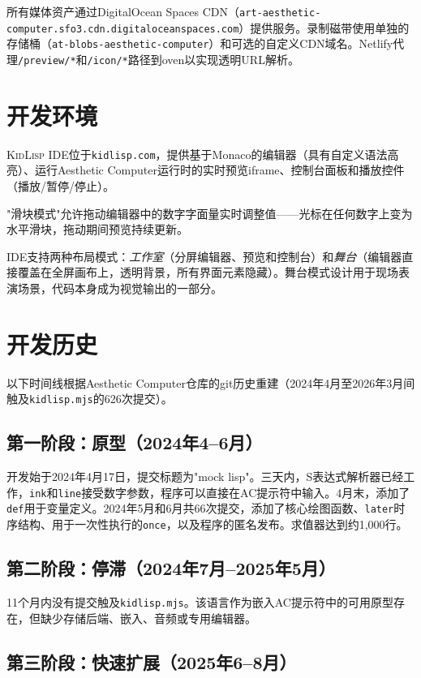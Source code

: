 \documentclass[10pt,letterpaper,twocolumn]{article}
\newcommand{\kidlisp}{\textsc{KidLisp}}
\begin{document}
所有媒体资产通过DigitalOcean Spaces CDN（\texttt{art-aesthetic-computer.sfo3.cdn.\allowbreak digitaloceanspaces.com}）提供服务。录制磁带使用单独的存储桶（\texttt{at-blobs-aesthetic-computer}）和可选的自定义CDN域名。Netlify代理\texttt{/preview/*}和\texttt{/icon/*}路径到oven以实现透明URL解析。

\section{开发环境}

\kidlisp{} IDE位于\texttt{kidlisp.com}，提供基于Monaco的编辑器（具有自定义语法高亮）、运行Aesthetic Computer运行时的实时预览iframe、控制台面板和播放控件（播放/暂停/停止）。

"滑块模式"允许拖动编辑器中的数字字面量实时调整值——光标在任何数字上变为水平滑块，拖动期间预览持续更新。

IDE支持两种布局模式：\emph{工作室}（分屏编辑器、预览和控制台）和\emph{舞台}（编辑器直接覆盖在全屏画布上，透明背景，所有界面元素隐藏）。舞台模式设计用于现场表演场景，代码本身成为视觉输出的一部分。

\section{开发历史}
\label{sec:history}

以下时间线根据Aesthetic Computer仓库的git历史重建（2024年4月至2026年3月间触及\texttt{kidlisp.mjs}的626次提交）。

\subsection{第一阶段：原型（2024年4--6月）}

开发始于2024年4月17日，提交标题为"mock lisp"。三天内，S表达式解析器已经工作，\texttt{ink}和\texttt{line}接受数字参数，程序可以直接在AC提示符中输入。4月末，添加了\texttt{def}用于变量定义。2024年5月和6月共66次提交，添加了核心绘图函数、\texttt{later}时序结构、用于一次性执行的\texttt{once}，以及程序的匿名发布。求值器达到约1,000行。

\subsection{第二阶段：停滞（2024年7月--2025年5月）}

11个月内没有提交触及\texttt{kidlisp.mjs}。该语言作为嵌入AC提示符中的可用原型存在，但缺少存储后端、嵌入、音频或专用编辑器。

\subsection{第三阶段：快速扩展（2025年6--8月）}
\end{document}
